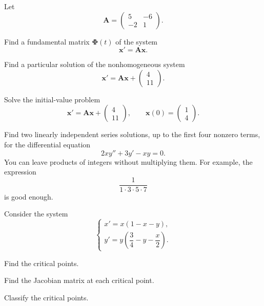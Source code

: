 \documentclass[11pt,oneside]{article}
\begin{document}
\begin{problem}
Let
\[
\mathbf A=
\begin{pmatrix}
5&-6\\
-2&1
\end{pmatrix}.
\]
\begin{problemsubparts}
\item Find a fundamental matrix $\boldsymbol{\Phi}(t)$ of the system
\[
\mathbf x'=\mathbf A\mathbf x.
\]
\item Find a particular solution of the nonhomogeneous system
\[
\mathbf x'=\mathbf A\mathbf x+
\begin{pmatrix}
4\\
11
\end{pmatrix}.
\]
\item Solve the initial-value problem
\[
\mathbf x'=\mathbf A\mathbf x+
\begin{pmatrix}
4\\
11
\end{pmatrix},
\qquad
\mathbf x(0)=
\begin{pmatrix}
1\\
4
\end{pmatrix}.
\]
\end{problemsubparts}
\end{problem}

\begin{problem}
Find two linearly independent series solutions, up to the first four nonzero terms, for the differential equation
\[
2xy''+3y'-xy=0.
\]
You can leave products of integers without multiplying them. For example, the expression
\[
\frac{1}{1\cdot3\cdot5\cdot7}
\]
is good enough.
\end{problem}

\begin{problem}
Consider the system
\[
\begin{cases}
x'=x(1-x-y),\\[0.2em]
y'=y\left(\dfrac34-y-\dfrac x2\right).
\end{cases}
\]
\begin{problemsubparts}
\item Find the critical points.
\item Find the Jacobian matrix at each critical point.
\item Classify the critical points.
\end{problemsubparts}
\end{problem}
\end{document}
